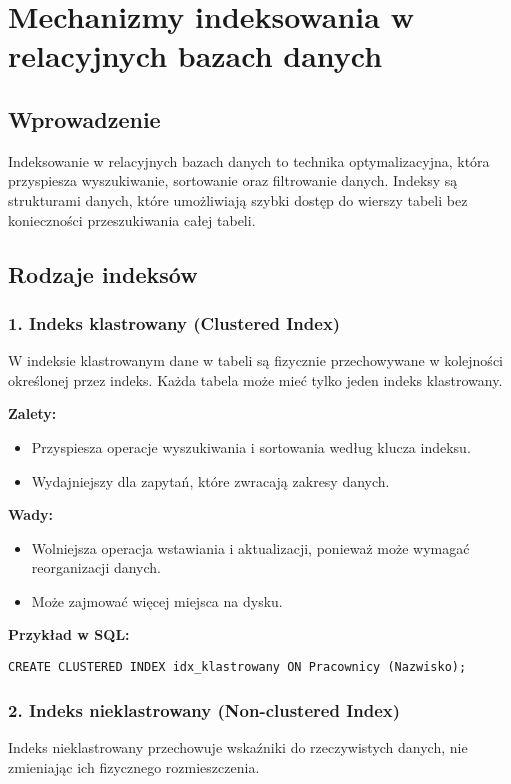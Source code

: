 \section{Mechanizmy indeksowania w relacyjnych bazach danych}

\subsection{Wprowadzenie}
Indeksowanie w relacyjnych bazach danych to technika optymalizacyjna, która przyspiesza wyszukiwanie, sortowanie oraz filtrowanie danych. Indeksy są strukturami danych, które umożliwiają szybki dostęp do wierszy tabeli bez konieczności przeszukiwania całej tabeli.

\subsection{Rodzaje indeksów}

\subsubsection{1. Indeks klastrowany (Clustered Index)}
W indeksie klastrowanym dane w tabeli są fizycznie przechowywane w kolejności określonej przez indeks. Każda tabela może mieć tylko jeden indeks klastrowany.

\textbf{Zalety:}
\begin{itemize}
    \item Przyspiesza operacje wyszukiwania i sortowania według klucza indeksu.
    \item Wydajniejszy dla zapytań, które zwracają zakresy danych.
\end{itemize}

\textbf{Wady:}
\begin{itemize}
    \item Wolniejsza operacja wstawiania i aktualizacji, ponieważ może wymagać reorganizacji danych.
    \item Może zajmować więcej miejsca na dysku.
\end{itemize}

\textbf{Przykład w SQL:}
\begin{verbatim}
CREATE CLUSTERED INDEX idx_klastrowany ON Pracownicy (Nazwisko);
\end{verbatim}

\subsubsection{2. Indeks nieklastrowany (Non-clustered Index)}
Indeks nieklastrowany przechowuje wskaźniki do rzeczywistych danych, nie zmieniając ich fizycznego rozmieszczenia.

